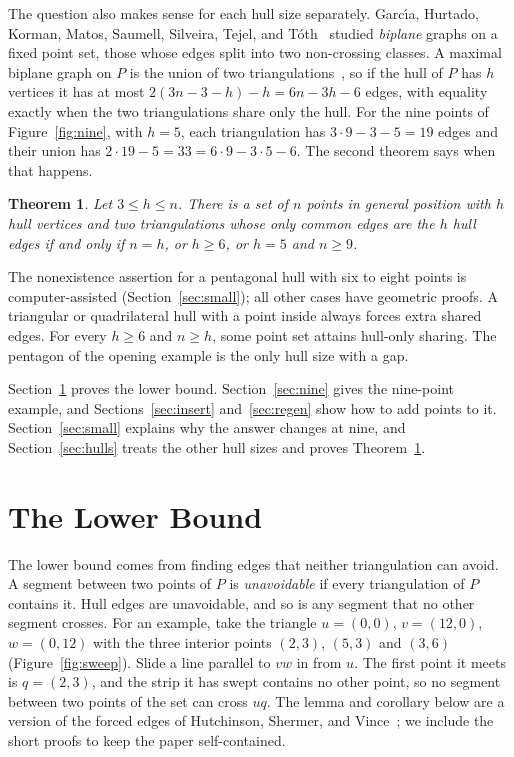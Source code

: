 \documentclass[11pt]{amsart}
\newtheorem{theorem}{Theorem}
\theoremstyle{definition}
\begin{document}
The question also makes sense for each hull size separately. Garc\'{\i}a, Hurtado, Korman, Matos, Saumell, Silveira, Tejel, and T\'oth~\cite{GHK} studied \emph{biplane} graphs on a fixed point set, those whose edges split into two non-crossing classes. A maximal biplane graph on $P$ is the union of two triangulations~\cite[Lemma~1]{GHK}, so if the hull of $P$ has $h$ vertices it has at most $2(3n-3-h)-h=6n-3h-6$ edges, with equality exactly when the two triangulations share only the hull. For the nine points of Figure~\ref{fig:nine}, with $h=5$, each triangulation has $3\cdot9-3-5=19$ edges and their union has $2\cdot19-5=33=6\cdot9-3\cdot5-6$. The second theorem says when that happens.

\begin{theorem}\label{thm:hull}
Let $3\leq h\leq n$. There is a set of $n$ points in general position with $h$ hull vertices and two triangulations whose only common edges are the $h$ hull edges if and only if $n=h$, or $h\geq6$, or $h=5$ and $n\geq9$.
\end{theorem}

The nonexistence assertion for a pentagonal hull with six to eight points is computer-assisted (Section~\ref{sec:small}); all other cases have geometric proofs. A triangular or quadrilateral hull with a point inside always forces extra shared edges. For every $h\geq6$ and $n\geq h$, some point set attains hull-only sharing. The pentagon of the opening example is the only hull size with a gap.

Section~\ref{sec:lower} proves the lower bound. Section~\ref{sec:nine} gives the nine-point example, and Sections~\ref{sec:insert} and~\ref{sec:regen} show how to add points to it. Section~\ref{sec:small} explains why the answer changes at nine, and Section~\ref{sec:hulls} treats the other hull sizes and proves Theorem~\ref{thm:hull}.

\section{The Lower Bound}\label{sec:lower}

The lower bound comes from finding edges that neither triangulation can avoid. A segment between two points of $P$ is \emph{unavoidable} if every triangulation of $P$ contains it. Hull edges are unavoidable, and so is any segment that no other segment crosses. For an example, take the triangle $u=(0,0)$, $v=(12,0)$, $w=(0,12)$ with the three interior points $(2,3)$, $(5,3)$ and $(3,6)$ (Figure~\ref{fig:sweep}). Slide a line parallel to $vw$ in from $u$. The first point it meets is $q=(2,3)$, and the strip it has swept contains no other point, so no segment between two points of the set can cross $uq$. The lemma and corollary below are a version of the forced edges of Hutchinson, Shermer, and Vince~\cite[Lemma~5 and the proof of Theorem~6]{HSV}; we include the short proofs to keep the paper self-contained.
\end{document}
